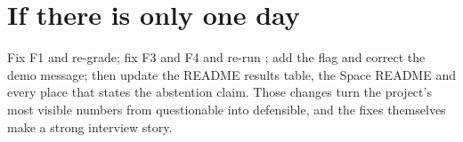 \section{If there is only one day}

\begin{recommended}
Fix F1 and re-grade; fix F3 and F4 and re-run ; add the  flag and correct the demo message; then update the README results table, the Space README and every place that states the abstention claim. Those changes turn the project's most visible numbers from questionable into defensible, and the fixes themselves make a strong interview story.
\end{recommended}
